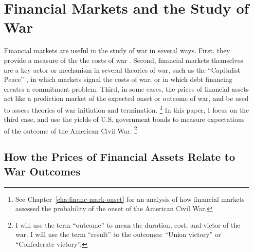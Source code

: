 

\section{Financial Markets and the Study of War}
\label{sec:barg-theory-war}

Financial markets are useful in the study of war in several ways.
First, they provide a measure of the the costs of war \parencites{SchneiderTroeger2006}{GuidolinLaFerrara2010}.
Second, financial markets themselves are a key actor or mechanism in several theories of war, such as the ``Capitalist Peace'' \parencites{Gartzke2007}{DafoeKelsey2014a}, in which markets signal the costs of war, or \textcite{Slantchev2012a} in which debt financing creates a commitment problem.
Third, in some cases, the prices of financial assets act like a prediction market of the expected onset or outcome of war, and be used to assess theories of war initiation and termination.%
\footnote{See Chapter~\ref{cha:financ-mark-onset} for an analysis of how financial markets assessed the probability of the onset of the American Civil War.}
In this paper, I focus on the third case, and use the yields of U.S. government bonds to measure expectations of the outcome of the American Civil War.%
\footnote{I will use the term ``outcome'' to mean the duration, cost, and victor of the war. I will use the term ``result'' to the outcomes: ``Union victory'' or ``Confederate victory''.}


\subsection{How the Prices of Financial Assets Relate to War Outcomes}
\label{sec:how-prices-financial}

